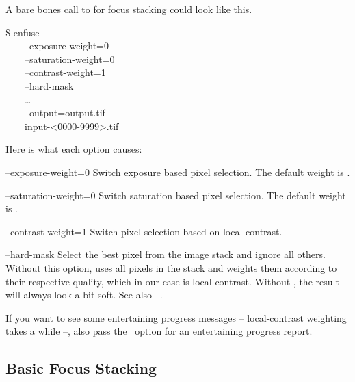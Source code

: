 A bare bones call to \App{} for focus stacking could look like this.

\begin{terminal}
  \$ enfuse \bslash \\
  ~~~~--exposure-weight=0 \bslash \\
  ~~~~--saturation-weight=0 \bslash \\
  ~~~~--contrast-weight=1 \bslash \\
  ~~~~--hard-mask \bslash \\
  ~~~~\dots{} \bslash \\
  ~~~~--output=output.tif \bslash \\
  ~~~~input-<0000-9999>.tif
\end{terminal}

Here is what each option causes:

\begin{codelist}
\item[--exposure-weight=0]\itemend
  Switch  exposure based pixel selection.  The default weight is
  .

\item[--saturation-weight=0]\itemend
  Switch  saturation based pixel selection.  The default weight is
  .

\item[--contrast-weight=1]\itemend
  Switch  pixel selection based on local contrast.

\item[--hard-mask]\itemend
  Select the best pixel from the image stack and ignore all others.  Without this option, \App{}
  uses all pixels in the stack and weights them according to their respective quality, which in
  our case is local contrast.  Without , the result will always look a bit
  soft.  See also \sectionName~.
\end{codelist}

If you want to see some entertaining progress messages -- local-contrast weighting takes a while
--, also pass the ~option for an entertaining progress report.


\subsection[Basic Focus Stacking]{\label{sec:basic-focus-stacking}%
  Basic Focus Stacking}

